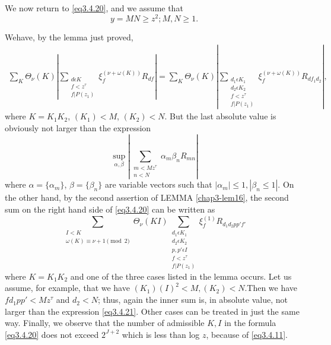 We now return to \eqref{eq3.4.20}, and we assume that
$$
y = MN \geq z^2; M, N \geq 1.
$$

We\pageoriginale have, by the lemma just proved,
\begin{gather*}
  \sum_{K} \Theta_\nu (K) | \sum_{\substack{d \epsilon  K\\ f <
      z^\tau \\ f| P(z_1)}} \xi^{(\nu + \omega  (K))}_f R_{df}| 
  = \sum_{K} \Theta_\nu (K) | \sum_{\substack{ d_1 \epsilon 
      K_1\\ d_2 \epsilon  K_2\\ f < z^\tau\\ f |P(z_1)}} \xi^{(\nu +
    \omega  (K))}_f R_{df_1 d_2}|, 
\end{gather*}
where $K = K_1K_2$, $(K_1) < M$, $(K_2) < N$. But the last absolute
value is obviously not larger than the expression 
\begin{equation*}
  \sup\limits_{\alpha, \beta} | \sum_{\substack{m < Mz^\tau \\ n < N}}
  \alpha_m \beta_n R_{mn} | \tag{3.4.21} \label{eq3.4.21}
\end{equation*}
where $\alpha = \{\alpha_m\}$, $\beta = \{\beta _n\}$ are variable
vectors such that $|\alpha_m| \le 1, |\beta_n \le 1|$.  On the other
hand, by the second assertion of LEMMA \ref{chap3-lem16}, 
the second sum on the
right hand side of \eqref{eq3.4.20} can be written as 
$$
\sum_{\substack{I < K \\ \omega (K) \equiv \nu + 1 \pmod{2}}}
\Theta_\nu (KI) \sum_{\substack{d_1 \epsilon  K_1\\ d_2 \epsilon 
    K_2\\ p, p' \epsilon  I\\ f < z^\tau\\ f |P (z_1)}} \xi^{(1)}_f
R_{d_1 d_2 pp' f'} 
$$
where $K= K_1K_2$ and one of the three cases listed in the lemma
occurs. Let us assume, for example, that we have $(K_1)(I)^2 < M,
(K_2) < N$.\pageoriginale Then we have $fd_1 pp' < Mz^\tau$ and $d_2 < N$; thus,
again the inner sum is, in absolute value, not larger than the
expression \eqref{eq3.4.21}. Other cases can be treated in just the same
way. Finally, we observe that the number of admissible $K, I$ in the
formula \eqref{eq3.4.20} does not exceed $2^{J + 2}$ which is less than log
$z$, because of \eqref{eq3.4.11}. 

